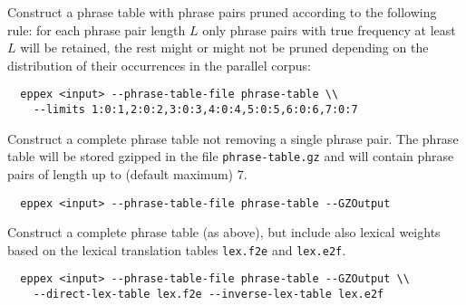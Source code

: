 Construct a phrase table with phrase pairs pruned according to the following rule:
for each phrase pair length $L$ only phrase pairs with true frequency at least
$L$ will be retained, the rest might or might not be pruned depending on the
distribution of their occurrences in the parallel corpus:
\begin{verbatim}
  eppex <input> --phrase-table-file phrase-table \\
    --limits 1:0:1,2:0:2,3:0:3,4:0:4,5:0:5,6:0:6,7:0:7
\end{verbatim}

Construct a complete phrase table not removing a single phrase pair.
The phrase table will be stored gzipped in the file \texttt{phrase-table.gz}
and will contain phrase pairs of length up to (default maximum) 7.
\begin{verbatim}
  eppex <input> --phrase-table-file phrase-table --GZOutput
\end{verbatim}

Construct a complete phrase table (as above), but include also lexical weights
based on the lexical translation tables \texttt{lex.f2e} and \texttt{lex.e2f}.
\begin{verbatim}
  eppex <input> --phrase-table-file phrase-table --GZOutput \\
    --direct-lex-table lex.f2e --inverse-lex-table lex.e2f
\end{verbatim}
